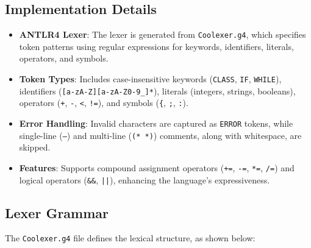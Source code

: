 \documentclass[12pt]{article}
\begin{document}
\subsection{Implementation Details}
\begin{itemize}[itemsep=2pt]
    \item \textbf{ANTLR4 Lexer}: The lexer is generated from \texttt{Coolexer.g4}, which specifies token patterns using regular expressions for keywords, identifiers, literals, operators, and symbols.
    
    \item \textbf{Token Types}: Includes case-insensitive keywords (\texttt{CLASS}, \texttt{IF}, \texttt{WHILE}), identifiers \newline (\texttt{[a-zA-Z][a-zA-Z0-9_]*}), literals (integers, strings, booleans), operators (\texttt{+}, \texttt{-}, \texttt{<}, \texttt{!=}), \newline and symbols (\texttt{\{}, \texttt{;}, \texttt{:}). \newline
    
    \item \textbf{Error Handling}: Invalid characters are captured as \texttt{ERROR} tokens, while single-line (\texttt{--}) and multi-line (\texttt{(* *)}) comments, along with whitespace, are skipped.
    
    \item \textbf{Features}: Supports compound assignment operators (\texttt{+=}, \texttt{-=}, \texttt{*=}, \texttt{/=}) and logical operators (\texttt{\&\&}, \texttt{||}), enhancing the language’s expressiveness.
\end{itemize}

\subsection{Lexer Grammar}
The \texttt{Coolexer.g4} file defines the lexical structure, as shown below:
\end{document}
